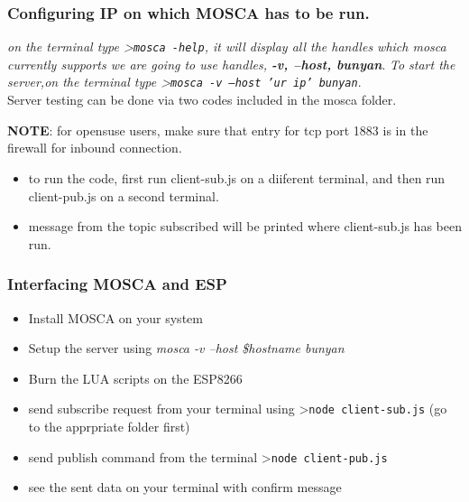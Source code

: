 \documentclass[16pt]{article}
\begin{document}
\subsubsection{Configuring IP on which MOSCA has to be run.}

\emph{on the terminal type \textgreater{}\texttt{mosca -help}, it will
display all the handles which mosca currently supports we are going to
use handles, {\textbf{-v, --host, \textbar{} bunyan}}}. \emph{To start the server,on
the terminal type \textgreater{}\texttt{mosca -v --host 'ur ip'
\textbar{}bunyan}}. \\ Server testing can be done via two codes included in
the mosca folder.

\vspace{0.3cm}

\textbf{NOTE}: for opensuse users, make sure that entry for tcp port
1883 is in the firewall for inbound connection.

\begin{itemize}

\item
  to run the code, first run client-sub.js on a diiferent terminal, and
  then run client-pub.js on a second terminal.
\item
  message from the topic subscribed will be printed where client-sub.js
  has been run.
\end{itemize}

\vspace{0.5cm}

\subsubsection{Interfacing MOSCA and ESP}

\begin{itemize}

\item
  Install MOSCA on your system
\item
  Setup the server using \emph{mosca -v --host \$hostname \textbar{}
  bunyan}
\item
  Burn the LUA scripts on the ESP8266
\item
  send subscribe request from your terminal using
  \textgreater{}\texttt{node client-sub.js} (go to the apprpriate folder
  first)
\item
  send publish command from the terminal
  \textgreater{}\texttt{node client-pub.js}
\item
  see the sent data on your terminal with confirm message
\end{itemize}
\end{document}

